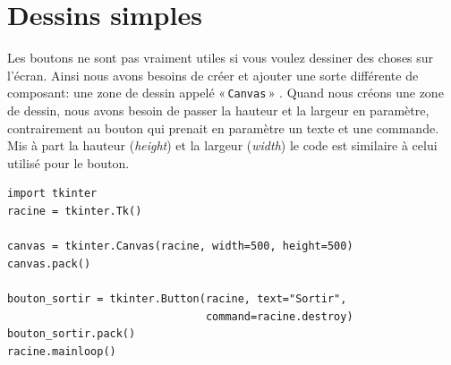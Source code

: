 \section{Dessins simples}

Les boutons ne sont pas vraiment utiles si vous voulez dessiner des choses sur l'écran. Ainsi nous avons besoins de créer et ajouter une sorte différente de composant: une zone de dessin appelé « \texttt{Canvas} » . Quand nous créons une zone de dessin, nous avons besoin de passer la hauteur et la largeur en paramètre, contrairement au bouton qui prenait en paramètre un texte et une commande. Mis à part la hauteur (\emph{height}) et la largeur (\emph{width}) le code est similaire à celui utilisé pour le bouton.

\begin{Verbatim}[frame=single,rulecolor=\color{mbleu}, label=à taper]
import tkinter
racine = tkinter.Tk()

canvas = tkinter.Canvas(racine, width=500, height=500)
canvas.pack()

bouton_sortir = tkinter.Button(racine, text="Sortir",
                               command=racine.destroy)
bouton_sortir.pack()
racine.mainloop()
\end{Verbatim}

